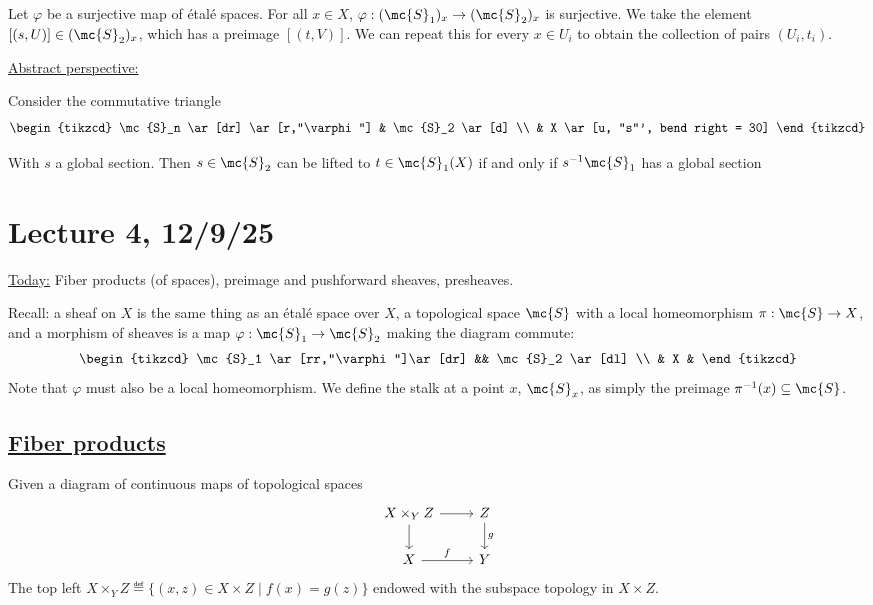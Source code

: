 \documentclass[x11names,reqno,14pt]{extarticle}
\begin{document}
Let $\varphi$ be a surjective map of \'etal\'e spaces. For all $x \in X$, $\varphi:(\mc{S}_1)_x \to (\mc{S}_2)_x$ is surjective. We take the element $[(s,U)] \in (\mc{S}_2)_x$, which has a preimage $[(t,V)]$. We can repeat this for every $x \in U_i$ to obtain the collection of pairs $(U_i,t_i)$.

\underline{Abstract perspective:}

Consider the commutative triangle 
\[
\begin{tikzcd}
\mc{S}_n \ar[dr] \ar[r,"\varphi"] & \mc{S}_2 \ar[d] \\
& X \ar[u, "s"', bend right = 30] 
\end{tikzcd}
\]

With $s$ a global section. Then $s \in \mc{S}_2$ can be lifted to $t \in \mc{S}_1(X)$ if and only if $s^{-1}\mc{S}_1$ has a global section

\section*{Lecture 4, 12/9/25}

\underline{Today:} Fiber products (of spaces), preimage and pushforward sheaves, presheaves. 

Recall: a sheaf on $X$ is the same thing as an \'etal\'e space over $X$, a topological space $\mc{S}$ with a local homeomorphism $\pi:\mc{S}\to X$, and a morphism of sheaves is a map $\varphi:\mc{S}_1\to\mc{S}_2$ making the diagram commute:
\[
\begin{tikzcd}
\mc{S}_1 \ar[rr,"\varphi"]\ar[dr] && \mc{S}_2 \ar[dl] \\
& X & 
\end{tikzcd}
\]
Note that $\varphi$ must also be a local homeomorphism.
We define the stalk at a point $x$, $\mc{S}_x$, as simply the preimage $\pi^{-1}(x) \subseteq \mc{S}$. 

\subsection*{\underline{Fiber products}}

Given a diagram of continuous maps of topological spaces
\[
\begin{tikzcd}
X\times_Y Z \ar[r] \ar[d] & Z \ar[d,"g"] \\
X \ar[r,"f"] & Y
\end{tikzcd}
\]
The top left $X\times_YZ \eqdef \{(x,z) \in X\times Z \mid f(x) = g(z) \}$ endowed with the subspace topology in $X\times Z$. 
\end{document}
